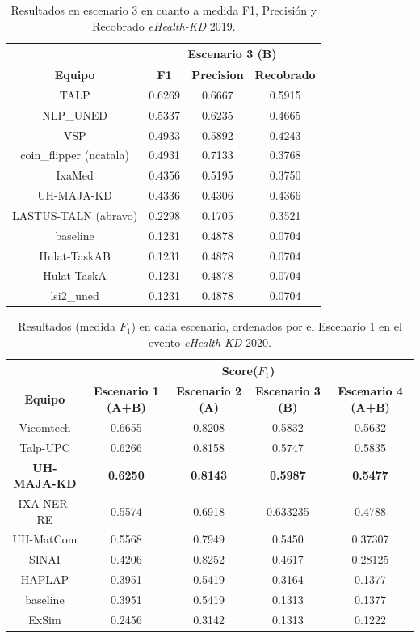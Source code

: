 \begin{table}[tb!]\centering
	\caption{Resultados en escenario 3 en cuanto a medida F1, Precisi\'on y Recobrado \textit{eHealth-KD} 2019. \label{table:results_19_escenario3}}
	\begin{tabular}{|c|c|c|c|}
		\hline
		&  \multicolumn{3}{c|}{\textbf{Escenario 3 (B) }} \\
		\hline
		\textbf{Equipo} & \textbf{F1} & \textbf{Precision} & \textbf{Recobrado} \\
		\hline
		TALP   & 0.6269	& 0.6667 & 0.5915 \\
		NLP\_UNED	& 0.5337 & 0.6235 & 0.4665 \\
		VSP	 & 0.4933 & 0.5892 & 0.4243 \\	
		coin\_flipper (ncatala) & 0.4931 & 0.7133 & 0.3768 \\
		IxaMed & 0.4356 & 0.5195 & 0.3750 \\	 
		UH-MAJA-KD & 0.4336 & 0.4306 & 0.4366 \\
		LASTUS-TALN (abravo) & 0.2298 & 0.1705 & 0.3521 \\	 
		baseline & 0.1231 & 0.4878 & 0.0704 \\
		Hulat-TaskAB & 0.1231 & 0.4878 & 0.0704 \\
		Hulat-TaskA & 0.1231 & 0.4878 & 0.0704 \\
		lsi2\_uned & 0.1231 & 0.4878 & 0.0704 \\
		\hline
	\end{tabular}
\end{table}


\begin{table}[tb!]\centering
	\caption{Resultados (medida $F_1$) en cada escenario, ordenados por el Escenario 1 en el evento \textit{eHealth-KD} 2020. \label{table:results_20}}
	\begin{tabular}{|c|c|c|c|c|}
		\hline
		&  \multicolumn{4}{c|}{\textbf{Score($F_1$)}} \\
		\hline
		\textbf{Equipo} & \textbf{Escenario 1 (A+B)} & \textbf{Escenario 2 (A)} & \textbf{Escenario 3 (B)} &  \textbf{Escenario 4 (A+B)}\\
		\hline
		Vicomtech & 0.6655 & 0.8208 & 0.5832 & 0.5632 \\
		Talp-UPC & 0.6266 & 0.8158 & 0.5747 & 0.5835  \\
		\textbf{UH-MAJA-KD} & \textbf{0.6250} & \textbf{0.8143} & \textbf{0.5987} & \textbf{0.5477} \\
		IXA-NER-RE & 0.5574 & 0.6918 & 0.633235 & 0.4788 \\
		UH-MatCom &	0.5568 & 0.7949 & 0.5450 & 0.37307 \\
		SINAI &	0.4206 & 0.8252 & 0.4617 & 0.28125 \\
		HAPLAP & 0.3951 & 0.5419 & 0.3164 & 0.1377 \\
		baseline & 0.3951 & 0.5419 & 0.1313 & 0.1377 \\
		ExSim &	0.2456 & 0.3142 & 0.1313 & 0.1222 \\
		\hline
	\end{tabular}
\end{table}


